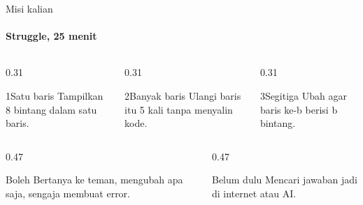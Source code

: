 \documentclass[t]{beamer}
\begin{document}

\begin{frame}{Misi kalian}
\framesubtitle{Struggle, 25 menit}
\begin{columns}[T]
\begin{column}{0.31\textwidth}
\begin{Langkah}{1}{Satu baris}
Tampilkan 8 bintang dalam satu baris.
\end{Langkah}
\end{column}
\begin{column}{0.31\textwidth}
\begin{Langkah}{2}{Banyak baris}
Ulangi baris itu 5 kali tanpa menyalin kode.
\end{Langkah}
\end{column}
\begin{column}{0.31\textwidth}
\begin{Langkah}{3}{Segitiga}
Ubah agar baris ke-b berisi b bintang.
\end{Langkah}
\end{column}
\end{columns}
\vspace{8pt}
\begin{columns}[T]
\begin{column}{0.47\textwidth}
\begin{Blok}{Boleh}
Bertanya ke teman, mengubah apa saja, sengaja membuat error.
\end{Blok}
\end{column}
\begin{column}{0.47\textwidth}
\begin{BlokAlert}{Belum dulu}
Mencari jawaban jadi di internet atau AI.
\end{BlokAlert}
\end{column}
\end{columns}
\end{frame}
\end{document}
